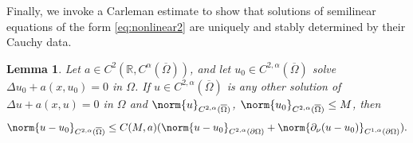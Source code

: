 \documentclass[11pt,a4paper]{amsart}
\newtheorem{Lemma}[Theorem]{Lemma}
\theoremstyle{definition}
\numberwithin{equation}{section}
\newcommand{\mR}{\mathbb{R}}                    %
\newcommand{\ol}[1]{\overline{#1}}
\newcommand{\p}{\partial}
\newcommand{\Om}{\Omega}
\begin{document}
Finally, we invoke a Carleman estimate to show that solutions of semilinear equations of the form \eqref{eq:nonlinear2} are uniquely and stably determined by their Cauchy data.

\begin{Lemma} \label{lem_carleman}
Let $a \in C^{2}(\mR, C^{\alpha}(\ol{\Om}))$, and let $u_0 \in C^{2,\alpha}(\ol{\Om})$ solve $\Delta u_0 + a(x,u_0) = 0$ in $\Om$. If  $u \in C^{2,\alpha}(\ol{\Om})$ is any other solution of $\Delta u + a(x,u) = 0$ in $\Om$ and $\norm{u}_{C^{2,\alpha}(\ol{\Om})}$, $\norm{u_0}_{C^{2,\alpha}(\ol{\Om})} \leq M$, then 
\begin{equation}\label{estimate_lem_carleman}
\norm{u-u_0}_{C^{2,\alpha}(\ol{\Om})} \leq C(M,a) (\norm{u-u_0}_{C^{2,\alpha}(\p \Om)} + \norm{\p_{\nu}(u-u_0)}_{C^{1,\alpha}(\p \Om)}).
\end{equation}
\end{Lemma}
\end{document}
